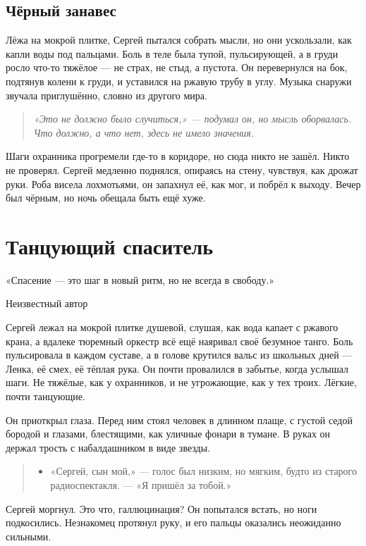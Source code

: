 \documentclass[12pt,a4paper]{book}
\newenvironment{dialogue}{\begin{quote}\itshape\begin{itemize}\item[]}{\end{itemize}\end{quote}}
\newenvironment{innerthought}{\begin{quote}\small\itshape}{\end{quote}}
\begin{document}
\section{Чёрный занавес}

Лёжа на мокрой плитке, Сергей пытался собрать мысли, но они ускользали, как капли воды под пальцами. Боль в теле была тупой, пульсирующей, а в груди росло что-то тяжёлое --- не страх, не стыд, а пустота. Он перевернулся на бок, подтянув колени к груди, и уставился на ржавую трубу в углу. Музыка снаружи звучала приглушённо, словно из другого мира.

\begin{innerthought}
«Это не должно было случиться,» --- подумал он, но мысль оборвалась. Что должно, а что нет, здесь не имело значения.
\end{innerthought}

Шаги охранника прогремели где-то в коридоре, но сюда никто не зашёл. Никто не проверял. Сергей медленно поднялся, опираясь на стену, чувствуя, как дрожат руки. Роба висела лохмотьями, он запахнул её, как мог, и побрёл к выходу. Вечер был чёрным, но ночь обещала быть ещё хуже.

\chapter{Танцующий спаситель}
\epigraph{«Спасение — это шаг в новый ритм, но не всегда в свободу.»}{Неизвестный автор}

Сергей лежал на мокрой плитке душевой, слушая, как вода капает с ржавого крана, а вдалеке тюремный оркестр всё ещё наяривал своё безумное танго. Боль пульсировала в каждом суставе, а в голове крутился вальс из школьных дней --- Ленка, её смех, её тёплая рука. Он почти провалился в забытье, когда услышал шаги. Не тяжёлые, как у охранников, и не угрожающие, как у тех троих. Лёгкие, почти танцующие.

Он приоткрыл глаза. Перед ним стоял человек в длинном плаще, с густой седой бородой и глазами, блестящими, как уличные фонари в тумане. В руках он держал трость с набалдашником в виде звезды.

\begin{dialogue}
«Сергей, сын мой,» --- голос был низким, но мягким, будто из старого радиоспектакля. --- «Я пришёл за тобой.»
\end{dialogue}

Сергей моргнул. Это что, галлюцинация? Он попытался встать, но ноги подкосились. Незнакомец протянул руку, и его пальцы оказались неожиданно сильными.
\end{document}
